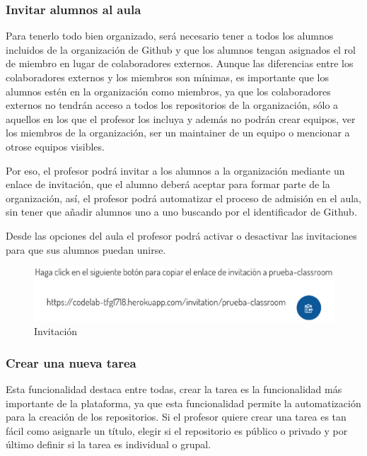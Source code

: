 \newpage
\subsubsection{Invitar alumnos al aula}

Para tenerlo todo bien organizado, será necesario tener a todos los alumnos incluidos de la organización de Github y que los alumnos tengan asignados el rol de miembro en lugar de colaboradores externos. Aunque las diferencias entre los colaboradores externos y los miembros son mínimas, 
es importante que los alumnos estén en la organización como miembros, ya que los colaboradores externos no tendrán acceso a todos los repositorios de la organización, sólo a aquellos en los que el profesor los incluya y además no podrán crear equipos, 
ver los miembros de la organización, ser un maintainer de un equipo o mencionar a otrose equipos visibles.

Por eso, el profesor podrá invitar a los alumnos a la organización mediante un enlace de invitación, que el alumno deberá aceptar para formar parte de la organización, así, el profesor podrá automatizar 
el proceso de admisión en el aula, sin tener que añadir alumnos uno a uno buscando por el identificador de Github.

Desde las opciones del aula el profesor podrá activar o desactivar las invitaciones para que sus alumnos puedan unirse.

\begin{figure}[!th]
\begin{center}
\includegraphics[scale=0.8]{images/invitacion}
\caption{Invitación}
\label{fig:Invitacion}
\end{center}
\end{figure}

\subsubsection{Crear una nueva tarea}

Esta funcionalidad destaca entre todas, crear la tarea es la funcionalidad más importante de la plataforma, ya que esta funcionalidad permite la automatización para la creación de los repositorios.
Si el profesor quiere crear una tarea es tan fácil como asignarle un título, elegir si el repositorio es público o privado y por último definir si la tarea es individual o grupal.

